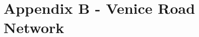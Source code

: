 \documentclass{standalone}
\begin{document}
\chapter*{Appendix B - Venice Road Network}
\end{document}
